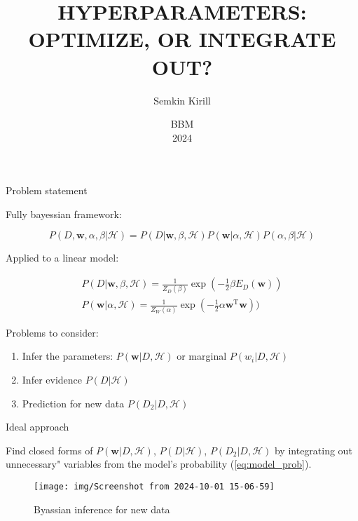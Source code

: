 \documentclass[10pt]{beamer}
\title{HYPERPARAMETERS: OPTIMIZE, OR INTEGRATE OUT?}
\author{Semkin Kirill}
\date[2024]{BBM \\ 2024}
\theoremstyle{definition}
\begin{document}
	
	\begin{frame}[c]
		\titlepage
	\end{frame}

	\begin{frame}{Problem statement}
		
		Fully bayessian framework:
		
		\begin{equation}\label{eq:model_prob}
			P(D, \mathbf{w}, \alpha, \beta | \mathcal{H}) = P(D | \mathbf{w}, \beta, \mathcal{H}) P(\mathbf{w} | \alpha, \mathcal{H}) P(\alpha, \beta | \mathcal{H})
		\end{equation}
		
		Applied to a linear model:
		
		\begin{gather*}
			P(D | \mathbf{w}, \beta, \mathcal{H}) = \frac{1}{Z_D(\beta)} \exp (- \frac{1}{2} \beta E_D(\mathbf{w})) \\
			P(\mathbf{w} | \alpha, \mathcal{H}) = \frac{1}{Z_W(\alpha)} \exp (- \frac{1}{2} \alpha \mathbf{w}^{\text{T}} \mathbf{w}))
		\end{gather*}
		
		Problems to consider:
		
		\begin{enumerate}
			\item Infer the parameters: $ P(\mathbf{w} | D, \mathcal{H}) $ or marginal $ P(w_i | D, \mathcal{H}) $
			\item Infer evidence $ P(D | \mathcal{H}) $
			\item Prediction for new data $ P(D_2 | D, \mathcal{H}) $
		\end{enumerate}
		
	\end{frame}	
	
	\begin{frame}{Ideal approach}
		
		Find closed forms of  $ P(\mathbf{w} | D, \mathcal{H}) $, $ P(D | \mathcal{H}) $, $ P(D_2 | D, \mathcal{H}) $ by integrating out unnecessary" variables from the model's probability (\ref{eq:model_prob}).
		
		\begin{figure}
			\centering
			\texttt{[image: img/Screenshot from 2024-10-01 15-06-59]}
			\caption{Byassian inference for new data}
		\end{figure}
		
	\end{frame}
	
\end{document}
